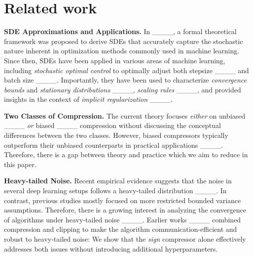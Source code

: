 \section{Related work}
\label{sec:RelatedWorks}


\textbf{SDE Approximations and Applications.} In ____, a formal theoretical framework was proposed to derive SDEs that accurately capture the stochastic nature inherent in optimization methods commonly used in machine learning. Since then, SDEs have been applied in various areas of machine learning, including \emph{stochastic optimal control} to optimally adjust both stepsize ____ and batch size ____. Importantly, they have been used to characterize \emph{convergence bounds} and \emph{stationary distributions} ____, \emph{scaling rules} ____, and provided insights in the context of \emph{implicit regularization} ____.

\textbf{Two Classes of Compression.} The current theory focuses \textit{either} on unbiased ____ \textit{or} biased ____ compression without discussing the conceptual differences between the two classes. However, biased compressors typically outperform their unbiased counterparts in practical applications ____. Therefore, there is a gap between theory and practice which we aim to reduce in this paper.

\textbf{Heavy-tailed Noise.} Recent empirical evidence suggests that the noise in several deep learning setups follows a heavy-tailed distribution ____. In contrast, previous studies mostly focused on more restricted bounded variance assumptions. Therefore, there is a growing interest in analyzing the convergence of algorithms under heavy-tailed noise  ____. Earlier works ____ combined compression and clipping to make the algorithm communication-efficient and robust to heavy-tailed noise: We show that the \textit{sign} compressor alone effectively addresses both issues without introducing additional hyperparameters.


